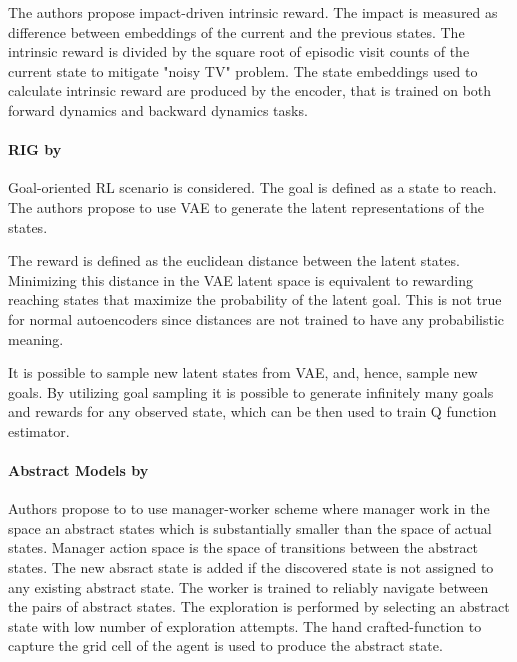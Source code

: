 \documentclass[acmsmall, nonacm]{acmart}
\begin{document}
The authors propose impact-driven intrinsic reward. The impact is measured as difference between embeddings of the current and the previous states. The intrinsic reward is divided by the square root of episodic visit counts of the current state to mitigate "noisy TV" problem. The state embeddings used to calculate intrinsic reward are produced by the encoder, that is trained on both forward dynamics and backward dynamics tasks.


\paragraph{RIG by \citet{Nair2018VisualRL}}

Goal-oriented RL scenario is considered. The goal is defined as a state to reach. The authors propose to use VAE to generate the latent representations of the states.

The reward is defined as the euclidean distance between the latent states. Minimizing this distance in the VAE latent space is equivalent to rewarding reaching states that maximize the probability of the latent goal. This is not true for normal autoencoders since distances are not trained to have any probabilistic meaning.

It is possible to sample new latent states from VAE, and, hence, sample new goals. By utilizing goal sampling it is possible to generate infinitely many goals and rewards for any observed state, which can be then used to train Q function estimator.


\paragraph{Abstract Models by \citet{liu_learning_2018}}

Authors propose to to use manager-worker scheme where manager work in the space an abstract states which is substantially smaller than the space of actual states. Manager action space is the space of transitions between the abstract states. The new absract state is  added if the discovered state is not assigned to any existing abstract state. The worker is trained to reliably navigate between the pairs of abstract states. The exploration is performed by selecting an abstract state with low number of exploration attempts. The hand crafted-function to capture the grid cell of the agent is used to produce the abstract state.
\end{document}
